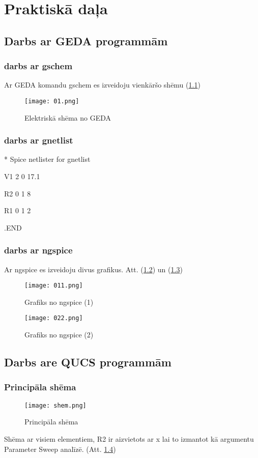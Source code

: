 \documentclass{report}
\begin{document}
\chapter{Praktiskā daļa}
\section{Darbs ar GEDA programmām}
\subsection{darbs ar gschem}
Ar GEDA komandu gschem es izveidoju vienkāršo shēmu (\ref{GEDA Shema})
\begin{figure}[!tb]
\texttt{[image: 01.png]}
\caption{Elektriskā shēma no GEDA}
\label{GEDA Shema}
\end{figure}
\subsection{darbs ar gnetlist}
\begin{flushleft}
* Spice netlister for gnetlist  

V1 2 0 17.1  

R2 0 1 8

R1 0 1 2  

.END  
  
\end{flushleft}
\subsection{darbs ar ngspice}
Ar ngspice es izveidoju divus grafikus. Att. (\ref{ngspice grafiks 1}) un (\ref{ngspice grafiks 2})
\begin{figure}[!tb]
\texttt{[image: 011.png]}
\caption{Grafiks no ngspice (1)}
\label{ngspice grafiks 1}
\end{figure}
\begin{figure}[!tb]
\texttt{[image: 022.png]}
\caption{Grafiks no ngspice (2)}
\label{ngspice grafiks 2}
\end{figure}
\section{Darbs are QUCS programmām}
\subsection{Principāla shēma}
\begin{figure}[!tb]
\texttt{[image: shem.png]}
\caption{Principāla shēma}
\label{Principala shema}
\end{figure}
Shēma ar visiem elementiem, R2 ir aizvietots ar x lai to izmantot kā argumentu Parameter Sweep analīzē. (Att. \ref{Principala shema})
\end{document}
